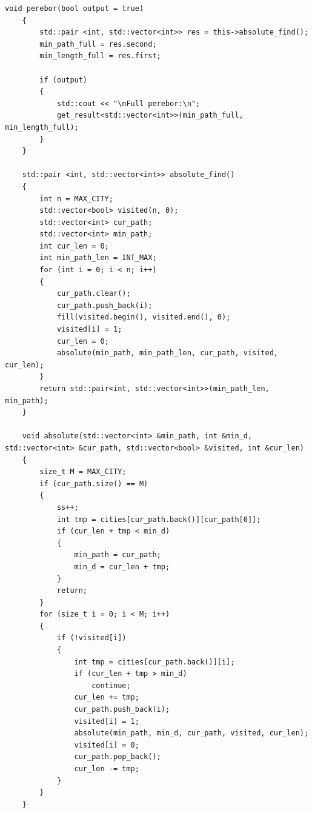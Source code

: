 \documentclass[a4paper,12pt]{report}
\begin{document}
        	\begin{lstlisting}[frame = single, breaklines, caption = Алгоритм полного перебора, label=list:seq_wino]
	void perebor(bool output = true)
	{
		std::pair <int, std::vector<int>> res = this->absolute_find();
		min_path_full = res.second;
		min_length_full = res.first;
	
		if (output)
		{
			std::cout << "\nFull perebor:\n";
			get_result<std::vector<int>>(min_path_full, min_length_full);
		}
	}
	
	std::pair <int, std::vector<int>> absolute_find()
	{
		int n = MAX_CITY;
		std::vector<bool> visited(n, 0);
		std::vector<int> cur_path;
		std::vector<int> min_path;
		int cur_len = 0;
		int min_path_len = INT_MAX;
		for (int i = 0; i < n; i++)
		{
			cur_path.clear();
			cur_path.push_back(i);
			fill(visited.begin(), visited.end(), 0);
			visited[i] = 1;
			cur_len = 0;
			absolute(min_path, min_path_len, cur_path, visited, cur_len);
		}
		return std::pair<int, std::vector<int>>(min_path_len, min_path);
	}
	
	void absolute(std::vector<int> &min_path, int &min_d, std::vector<int> &cur_path, std::vector<bool> &visited, int &cur_len)
	{
		size_t M = MAX_CITY;
		if (cur_path.size() == M)
		{
			ss++;
			int tmp = cities[cur_path.back()][cur_path[0]];
			if (cur_len + tmp < min_d)
			{
				min_path = cur_path;
				min_d = cur_len + tmp;
			}
			return;
		}
		for (size_t i = 0; i < M; i++)
		{
			if (!visited[i])
			{
				int tmp = cities[cur_path.back()][i];
				if (cur_len + tmp > min_d)
					continue;
				cur_len += tmp;
				cur_path.push_back(i);
				visited[i] = 1;
				absolute(min_path, min_d, cur_path, visited, cur_len);
				visited[i] = 0;
				cur_path.pop_back();
				cur_len -= tmp;
			}
		}
	}
        	\end{lstlisting}
        	
\end{document}
